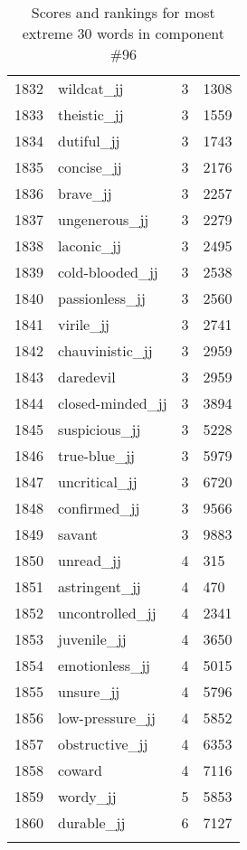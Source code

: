 \begin{longtable}[!htbp]{| rlr@{.}l |}
    1832 & wildcat\_jj & 3 & 1308 \\
    1833 & theistic\_jj & 3 & 1559 \\
    1834 & dutiful\_jj & 3 & 1743 \\
    1835 & concise\_jj & 3 & 2176 \\
    1836 & brave\_jj & 3 & 2257 \\
    1837 & ungenerous\_jj & 3 & 2279 \\
    1838 & laconic\_jj & 3 & 2495 \\
    1839 & cold-blooded\_jj & 3 & 2538 \\
    1840 & passionless\_jj & 3 & 2560 \\
    1841 & virile\_jj & 3 & 2741 \\
    1842 & chauvinistic\_jj & 3 & 2959 \\
    1843 & daredevil & 3 & 2959 \\
    1844 & closed-minded\_jj & 3 & 3894 \\
    1845 & suspicious\_jj & 3 & 5228 \\
    1846 & true-blue\_jj & 3 & 5979 \\
    1847 & uncritical\_jj & 3 & 6720 \\
    1848 & confirmed\_jj & 3 & 9566 \\
    1849 & savant & 3 & 9883 \\
    1850 & unread\_jj & 4 & 315 \\
    1851 & astringent\_jj & 4 & 470 \\
    1852 & uncontrolled\_jj & 4 & 2341 \\
    1853 & juvenile\_jj & 4 & 3650 \\
    1854 & emotionless\_jj & 4 & 5015 \\
    1855 & unsure\_jj & 4 & 5796 \\
    1856 & low-pressure\_jj & 4 & 5852 \\
    1857 & obstructive\_jj & 4 & 6353 \\
    1858 & coward & 4 & 7116 \\
    1859 & wordy\_jj & 5 & 5853 \\
    1860 & durable\_jj & 6 & 7127 \\
    \hline
    \caption{Scores and rankings for most extreme 30 words in component \#96} \\
\end{longtable}
